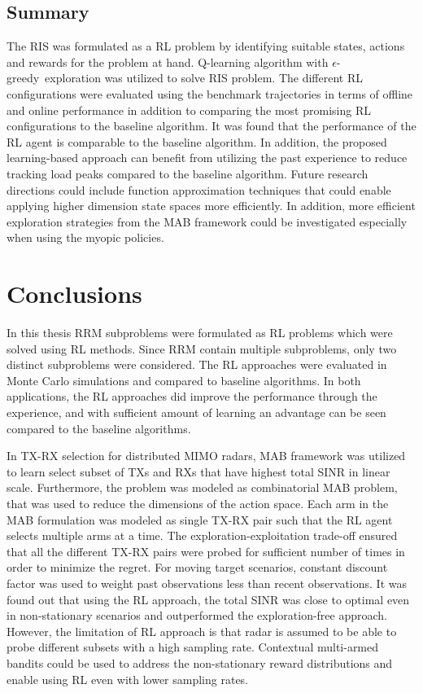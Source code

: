 \documentclass[english, 12pt, a4paper, elec, utf8, a-1b, online]{aaltothesis}
\newcommand{\egreedy}{$\epsilon$-greedy~}
\begin{document}
\subsection{Summary}

The RIS was formulated as a RL problem by identifying suitable states, actions and rewards for the problem at hand.
Q-learning algorithm with \egreedy exploration was utilized to solve RIS problem.
The different RL configurations were evaluated using the benchmark trajectories in terms of offline and online performance in addition to comparing the most promising RL configurations to the baseline algorithm.
It was found that the performance of the RL agent is comparable to the baseline algorithm.
In addition, the proposed learning-based approach can benefit from utilizing the past experience to reduce tracking load peaks compared to the baseline algorithm.
Future research directions could include function approximation techniques that could enable applying higher dimension state spaces more efficiently. 
In addition, more efficient exploration strategies from the MAB framework could be investigated especially when using the myopic policies.


\newpage
\section{Conclusions} \label{sec:conclusions}

In this thesis RRM subproblems were formulated as RL problems which were solved using RL methods. 
Since RRM contain multiple subproblems, only two distinct subproblems were considered. 
The RL approaches were evaluated in Monte Carlo simulations and compared to baseline algorithms. 
In both applications, the RL approaches did improve the performance through the experience, and with sufficient amount of learning an advantage can be seen compared to the baseline algorithms.

In TX-RX selection for distributed MIMO radars, MAB framework was utilized to learn select subset of TXs and RXs that have highest total SINR in linear scale. 
Furthermore, the problem was modeled as combinatorial MAB problem, that was used to reduce the dimensions of the action space.  
Each arm in the MAB formulation was modeled as  single TX-RX pair such that the RL agent selects multiple arms at a time. 
The exploration-exploitation trade-off ensured that all the different TX-RX pairs were probed for sufficient number of times in order to minimize the regret. 
For moving target scenarios, constant discount factor was used to weight past observations less than recent observations. 
It was found out that using the RL approach, the total SINR was close to optimal even in non-stationary scenarios and outperformed the exploration-free approach. 
However, the limitation of RL approach is that radar is assumed to be able to probe different subsets with a high sampling rate.
Contextual multi-armed bandits could be used to address the non-stationary reward distributions and enable using RL even with lower sampling rates. 
\end{document}
